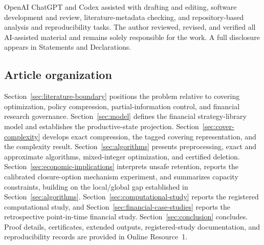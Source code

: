 OpenAI ChatGPT and Codex assisted with drafting and editing, software
development and review, literature-metadata checking, and repository-based
analysis and reproducibility tasks. The author reviewed, revised, and verified
all AI-assisted material and remains solely responsible for the work. A full
disclosure appears in Statements and Declarations.

\subsection{Article organization}

Section~\ref{sec:literature-boundary} positions the problem relative to
covering optimization, policy compression, partial-information control, and
financial research governance. Section~\ref{sec:model} defines the financial
strategy-library model and establishes the productive-state projection.
Section~\ref{sec:cover-complexity} develops exact compression, the tagged
covering representation, and the complexity result. Section~\ref{sec:algorithms}
presents preprocessing, exact and approximate algorithms, mixed-integer
optimization, and certified deletion. Section~\ref{sec:economic-implications}
interprets unsafe retention, reports the calibrated closure-option mechanism
experiment, and summarizes capacity constraints, building on the local/global
gap established in Section~\ref{sec:algorithms}.
Section~\ref{sec:computational-study} reports the registered computational
study, and Section~\ref{sec:financial-case-studies} reports the retrospective
point-in-time financial study. Section~\ref{sec:conclusion} concludes. Proof details,
certificates, extended outputs, registered-study documentation, and
reproducibility records are provided in Online Resource~1.
